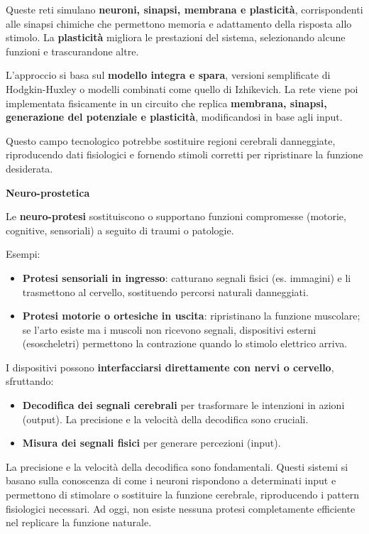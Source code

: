 \documentclass[12pt,a4paper,openany]{book}
\begin{document}
Queste reti simulano \textbf{neuroni, sinapsi, membrana e plasticità}, corrispondenti alle sinapsi chimiche che permettono memoria e adattamento della risposta allo stimolo. La \textbf{plasticità }migliora le prestazioni del sistema, selezionando alcune funzioni e trascurandone altre.

L'approccio si basa sul \textbf{modello integra e spara}, versioni semplificate di Hodgkin-Huxley o modelli combinati come quello di Izhikevich. La rete viene poi implementata fisicamente in un circuito che replica \textbf{membrana, sinapsi, generazione del potenziale e plasticità}, modificandosi in base agli input.

Questo campo tecnologico potrebbe sostituire regioni cerebrali danneggiate, riproducendo dati fisiologici e fornendo stimoli corretti per ripristinare la funzione desiderata.

\textbf{Neuro-prostetica}

Le \textbf{neuro-protesi }sostituiscono o supportano funzioni compromesse (motorie, cognitive, sensoriali) a seguito di traumi o patologie.

Esempi:

\begin{itemize}
  \item \textbf{Protesi sensoriali in ingresso}: catturano segnali fisici (es. immagini) e li trasmettono al cervello, sostituendo percorsi naturali danneggiati.
  \item \textbf{Protesi motorie o ortesiche in uscita}: ripristinano la funzione muscolare; se l'arto esiste ma i muscoli non ricevono segnali, dispositivi esterni (esoscheletri) permettono la contrazione quando lo stimolo elettrico arriva.
\end{itemize}
I dispositivi possono \textbf{interfacciarsi direttamente con nervi o cervello}, sfruttando:

\begin{itemize}
  \item \textbf{Decodifica dei segnali cerebrali }per trasformare le intenzioni in azioni (output). La precisione e la velocità della decodifica sono cruciali.
  \item \textbf{Misura dei segnali fisici }per generare percezioni (input).
\end{itemize}
La precisione e la velocità della decodifica sono fondamentali. Questi sistemi si basano sulla conoscenza di come i neuroni rispondono a determinati input e permettono di stimolare o sostituire la funzione cerebrale, riproducendo i pattern fisiologici necessari. Ad oggi, non esiste nessuna protesi completamente efficiente nel replicare la funzione naturale.
\end{document}

